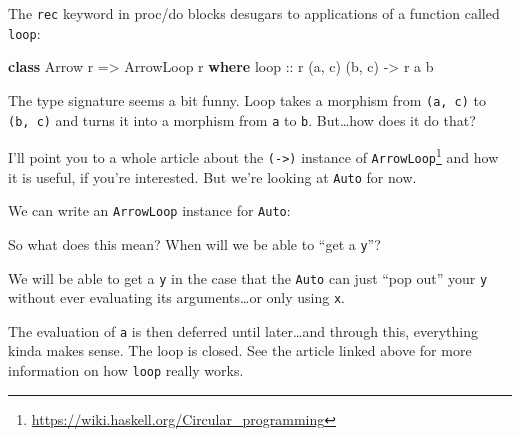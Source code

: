 \documentclass[]{article}
\newenvironment{Shaded}{}{}
\newcommand{\CommentTok}[1]{\textcolor[rgb]{0.38,0.63,0.69}{\textit{#1}}}
\newcommand{\DataTypeTok}[1]{\textcolor[rgb]{0.56,0.13,0.00}{#1}}
\newcommand{\FunctionTok}[1]{\textcolor[rgb]{0.02,0.16,0.49}{#1}}
\newcommand{\KeywordTok}[1]{\textcolor[rgb]{0.00,0.44,0.13}{\textbf{#1}}}
\newcommand{\NormalTok}[1]{#1}
\newcommand{\OtherTok}[1]{\textcolor[rgb]{0.00,0.44,0.13}{#1}}
\renewcommand{\href}[2]{#2\footnote{\url{#1}}}
\begin{document}
The \texttt{rec} keyword in proc/do blocks desugars to applications of a
function called \texttt{loop}:

\begin{Shaded}
\begin{Highlighting}[]
\KeywordTok{class} \DataTypeTok{Arrow}\NormalTok{ r }\OtherTok{=>} \DataTypeTok{ArrowLoop}\NormalTok{ r }\KeywordTok{where}
\OtherTok{    loop ::}\NormalTok{ r (a, c) (b, c) }\OtherTok{->}\NormalTok{ r a b}
\end{Highlighting}
\end{Shaded}

The type signature seems a bit funny. Loop takes a morphism from
\texttt{(a,\ c)} to \texttt{(b,\ c)} and turns it into a morphism from
\texttt{a} to \texttt{b}. But\ldots{}how does it do that?

I'll point you to \href{https://wiki.haskell.org/Circular_programming}{a whole
article about the \texttt{(-\textgreater{})} instance of \texttt{ArrowLoop}} and
how it is useful, if you're interested. But we're looking at \texttt{Auto} for
now.

We can write an \texttt{ArrowLoop} instance for \texttt{Auto}:

\begin{Shaded}
\end{Shaded}

So what does this mean? When will we be able to ``get a \texttt{y}''?

We will be able to get a \texttt{y} in the case that the \texttt{Auto} can just
``pop out'' your \texttt{y} without ever evaluating its arguments\ldots{}or only
using \texttt{x}.

The evaluation of \texttt{a\textquotesingle{}} is then deferred until
later\ldots{}and through this, everything kinda makes sense. The loop is closed.
See the article linked above for more information on how \texttt{loop} really
works.
\end{document}
